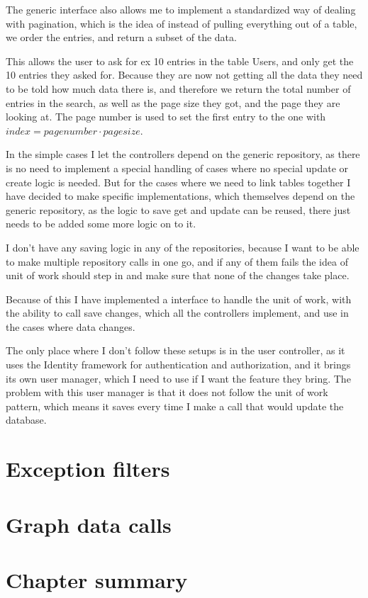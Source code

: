 The generic interface also allows me to implement a standardized way of dealing with pagination, which is the idea of instead of pulling everything out of a table, we order the entries, and return a subset of the data.

This allows the user to ask for ex 10 entries in the table Users, and only get the 10 entries they asked for. Because they are now not getting all the data they need to be told how much data there is, and therefore we return the total number of entries in the search, as well as the page size they got, and the page they are looking at. The page number is used to set the first entry to the one with $index = page number \cdot page size$.

In the simple cases I let the controllers depend on the generic repository, as there is no need to implement a special handling of cases where no special update or create logic is needed. But for the cases where we need to link tables together I have decided to make specific implementations, which themselves depend on the generic repository, as the logic to save get and update can be reused, there just needs to be added some more logic on to it.

I don't have any saving logic in any of the repositories, because I want to be able to make multiple repository calls in one go, and if any of them fails the idea of unit of work should step in and make sure that none of the changes take place.

Because of this I have implemented a interface to handle the unit of work, with the ability to call save changes, which all the controllers implement, and use in the cases where data changes.

The only place where I don't follow these setups is in the user controller, as it uses the Identity framework for authentication and authorization, and it brings its own user manager, which I need to use if I want the feature they bring. The problem with this user manager is that it does not follow the unit of work pattern, which means it saves every time I make a call that would update the database.

\section{Exception filters}
\label{sec:Exception filters}


\section{Graph data calls}
\label{sec:Graph data calls}


\section{Chapter summary}
